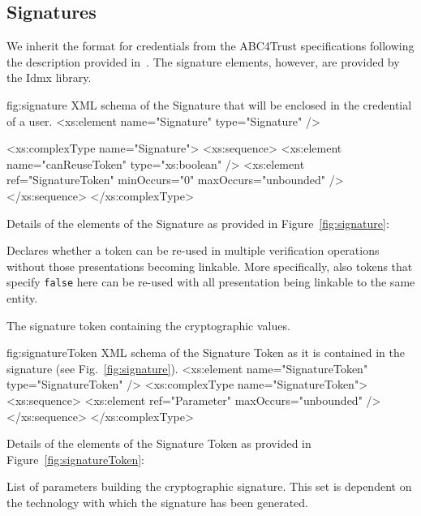   





\subsection{Signatures}

We inherit the format for credentials from the ABC4Trust specifications following the description provided 
in~\cite{abc4trust:h22}.
The signature elements, however, are provided by the Idmx library.

\begin{xml}
{fig:signature}
{XML schema of the Signature that will be enclosed in the credential of a user.}
<xs:element name="Signature" type="Signature" />

<xs:complexType name="Signature">
  <xs:sequence>
    <xs:element name="canReuseToken" type="xs:boolean" />
    <xs:element ref="SignatureToken" minOccurs="0" maxOccurs="unbounded" />
  </xs:sequence>
</xs:complexType>
\end{xml}

\vspace{3pt}\noindent Details of the elements of the Signature as provided in Figure~\ref{fig:signature}:
\begin{parameter}
Declares whether a token can be re-used in multiple verification operations without those presentations becoming linkable.
More specifically, also tokens that specify \texttt{false} here can be re-used with all presentation being linkable
to the same entity.
\end{parameter}
\begin{parameter}
The signature token containing the cryptographic values.
\end{parameter}



\begin{xml}
{fig:signatureToken}
{XML schema of the Signature Token as it is contained in the signature (see Fig.~\ref{fig:signature}).}
<xs:element name="SignatureToken" type="SignatureToken" />
<xs:complexType name="SignatureToken">
  <xs:sequence>
    <xs:element ref="Parameter" maxOccurs="unbounded" />
  </xs:sequence>
</xs:complexType>
\end{xml}

\vspace{3pt}\noindent Details of the elements of the Signature Token as provided in Figure~\ref{fig:signatureToken}:
\begin{parameter}
List of parameters building the cryptographic signature. This set is dependent on the technology with which the 
signature has been generated.
\end{parameter}
  
